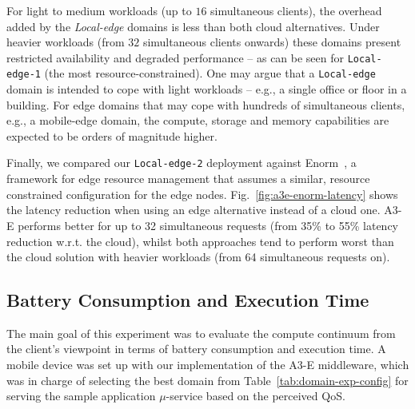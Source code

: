For light to medium workloads (up to $16$ simultaneous clients), the overhead added by the \textit{Local-edge} domains is less than both cloud alternatives. Under heavier workloads (from $32$ simultaneous clients onwards) these domains present restricted availability and degraded performance -- as can be seen for \texttt{Local-edge-1} (the most resource-constrained). One may argue that a \texttt{Local-edge} domain is intended to cope with light workloads -- e.g., a single office or floor in a building. For edge domains that may cope with hundreds of simultaneous clients, e.g., a mobile-edge domain, the compute, storage and memory capabilities are expected to be orders of magnitude higher.
 
Finally, we compared our \texttt{Local-edge-2} deployment against Enorm~\cite{wang2017enorm}, a framework for edge resource management that assumes a similar, resource constrained configuration for the edge nodes. %
Fig.~\ref{fig:a3e-enorm-latency} shows the latency reduction when using an edge alternative instead of a cloud one. A3-E performs better for up to 32 simultaneous requests (from 35\% to 55\% latency reduction w.r.t. the cloud), whilst both approaches tend to perform worst than the cloud solution with heavier workloads (from 64 simultaneous requests on).  




\subsection{Battery Consumption and Execution Time} 
\label{sub:exp-a3e-continuum}

The main goal of this experiment was to evaluate the compute continuum 
from the client's viewpoint in terms of battery consumption and execution time. A mobile device was set up with our implementation of the A3-E middleware, which was in charge of selecting the best domain from Table~\ref{tab:domain-exp-config} for serving the sample application $\mu$-service based on the perceived QoS.

